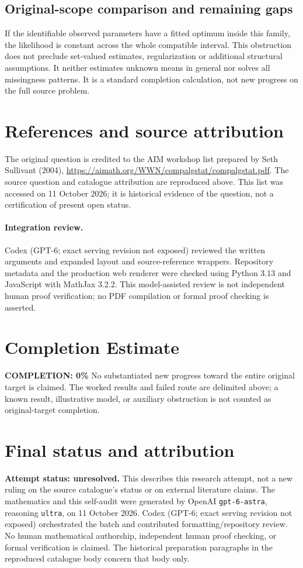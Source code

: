 \documentclass[11pt]{article}
\begin{document}
\subsection{Original-scope comparison and remaining gaps}
If the identifiable observed parameters have a fitted optimum inside this family, the likelihood is constant across the whole compatible interval. This obstruction does not preclude set-valued estimates, regularization or additional structural assumptions. It neither estimates unknown means in general nor solves all missingness patterns. It is a standard completion calculation, not new progress on the full source problem.

\section{References and source attribution}
The original question is credited to the AIM workshop list prepared by Seth Sullivant (2004), \url{https://aimath.org/WWN/compalgstat/compalgstat.pdf}. The source question and catalogue attribution are reproduced above. This list was accessed on 11 October 2026; it is historical evidence of the question, not a certification of present open status.


\paragraph{Integration review.} Codex (GPT-6; exact serving revision not exposed) reviewed the written arguments and expanded layout and source-reference wrappers. Repository metadata and the production web renderer were checked using Python 3.13 and JavaScript with MathJax 3.2.2. This model-assisted review is not independent human proof verification; no PDF compilation or formal proof checking is asserted.

\section{Completion Estimate}
\noindent\textbf{COMPLETION: 0\%}
No substantiated new progress toward the entire original target is claimed. The worked results and failed route are delimited above; a known result, illustrative model, or auxiliary obstruction is not counted as original-target completion.

\section{Final status and attribution}
\textbf{Attempt status: unresolved.} This describes this research attempt, not a new ruling on the source catalogue's status or on external literature claims.
The mathematics and this self-audit were generated by OpenAI \texttt{gpt-6-astra}, reasoning \texttt{ultra}, on 11 October 2026. Codex (GPT-6; exact serving revision not exposed) orchestrated the batch and contributed formatting/repository review. No human mathematical authorship, independent human proof checking, or formal verification is claimed. The historical preparation paragraphs in the reproduced catalogue body concern that body only.
\end{document}

